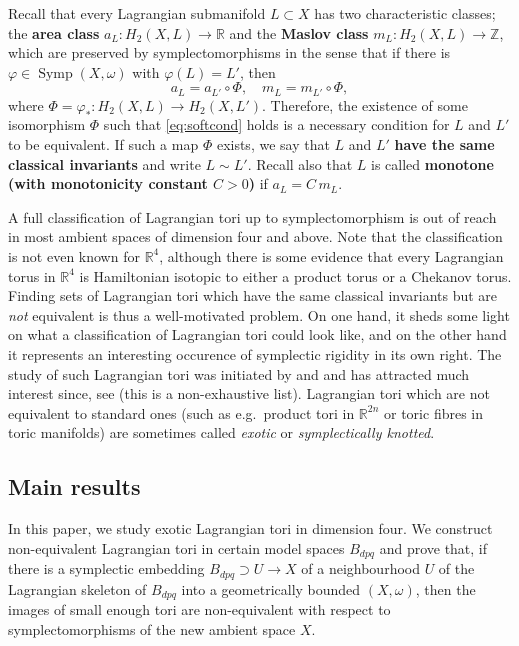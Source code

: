 \documentclass[12pt,a4paper,abstract=true,draft]{scrartcl}
\begin{document}
Recall that every Lagrangian submanifold $L \subset X$ has two characteristic classes; the  \textbf{area class} $a_L \colon H_2(X,L) \rightarrow \mathbb{R}$ and the \textbf{Maslov class} $m_L \colon H_2(X,L) \rightarrow \mathbb{Z}$, which are preserved by symplectomorphisms in the sense that if there is $φ \in \operatorname{Symp}(X,\omega)$ with $φ(L) = L'$, then 
\begin{equation}
    \label{eq:softcond}
    a_{L} = a_{L'} \circ Φ, \quad
    m_{L} = m_{L'} \circ Φ, 
\end{equation}
where $Φ = φ_* \colon H_2(X,L) \rightarrow H_2(X,L')$.
Therefore, the existence of some isomorphism $Φ$ such that \eqref{eq:softcond} holds is a necessary condition for $L$ and $L'$ to be equivalent.
If such a map $Φ$ exists, we say that $L$ and $L'$ \textbf{have the same classical invariants} and write $L \sim L'$.
Recall also that $L$ is called \textbf{monotone (with monotonicity constant $C > 0$)} if $a_L = C \, m_L$. 

A full classification of Lagrangian tori up to symplectomorphism is out of reach in most ambient spaces of dimension four and above.
Note that the classification is not even known for $\mathbb{R}^4$, although there is some evidence \cite{Riz19} that every Lagrangian torus in $\mathbb{R}^4$ is Hamiltonian isotopic to either a product torus or a Chekanov torus.
Finding sets of Lagrangian tori which have the same classical invariants but are \emph{not} equivalent is thus a well-motivated problem.
On one hand, it sheds some light on what a classification of Lagrangian tori could look like, and on the other hand it represents an interesting occurence of symplectic rigidity in its own right.
The study of such Lagrangian tori was initiated by \cite{Che96} and \cite{EliPol97} and has attracted much interest since,  see \cite{Aur15, brendel2020real, CheSch10, FOOO12, GalMik22, SheTonVia19, Via17, Via16} (this is a non-exhaustive list).
Lagrangian tori which are not equivalent to standard ones (such as e.g.\ product tori in $\mathbb{R}^{2n}$ or toric fibres in toric manifolds) are sometimes called \emph{exotic} or \emph{symplectically knotted}. 

\subsection{Main results}
\label{sec:intro_main_results}

In this paper, we study exotic Lagrangian tori in dimension four.
We construct non-equivalent Lagrangian tori in certain model spaces $B_{dpq}$ and prove that, if there is a symplectic embedding $B_{dpq} \supset U \rightarrow X$ of a neighbourhood $U$ of the Lagrangian skeleton of $B_{dpq}$ into a geometrically bounded $(X,\omega)$, then the images of small enough tori are non-equivalent with respect to symplectomorphisms of the new ambient space $X$.
\end{document}
